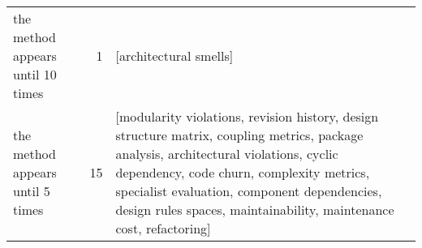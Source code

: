 \begin{tabular}{lrl}
 the method appears until 10 times &      1 &                                                                                                                                                                                                                                                                                                                                                                                                                                                                                                                                                                                                                                                                                                                                                                                                                                                                                                                                                                                                                                                                                                                                                                                                                                                                                                                                                                                                                                                                                                              [architectural smells] \\
  the method appears until 5 times &     15 &                                                                                                                                                                                                                                                                                                                                                                                                                                                                                                                                                                                                                                                                                                                                                                                                                                                                                                                                                                                                                                                                                                                                                                                                                             [modularity violations, revision history, design structure matrix, coupling metrics, package analysis, architectural violations, cyclic dependency, code churn, complexity metrics, specialist evaluation, component dependencies, design rules spaces, maintainability, maintenance cost, refactoring] \\

\end{tabular}
